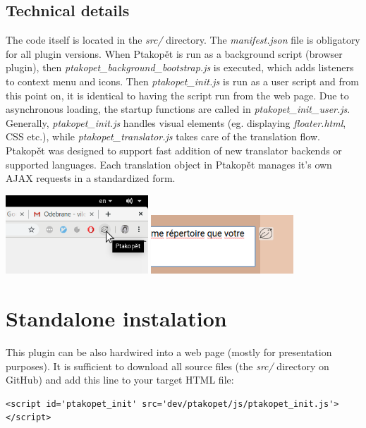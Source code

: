 \documentclass[a4paper]{article}
\begin{document}
\subsection{Technical details}
The code itself is located in the \textit{src/} directory. The \textit{manifest.json} file is obligatory for all plugin versions. When Ptakopět is run as a background script (browser plugin), then \textit{ptakopet\_background\_bootstrap.js} is executed, which adds listeners to context menu and icons. Then \textit{ptakopet\_init.js} is run as a user script and from this point on, it is identical to having the script run from the web page. Due to asynchronous loading, the startup functions are called in \textit{ptakopet\_init\_user.js}. Generally, \textit{ptakopet\_init.js} handles visual elements (eg. displaying \textit{floater.html}, CSS etc.), while \textit{ptakopet\_translator.js} takes care of the translation flow. Ptakopět was designed to support fast addition of new translator backends or supported languages. Each translation object in Ptakopět manages it's own AJAX requests in a standardized form.

\vspace{1cm}
\begin{center}
\includegraphics[width=0.4\textwidth]{screenshot_5}
\hspace{2cm}
\includegraphics[width=0.4\textwidth]{screenshot_6}
\end{center}

\section{Standalone instalation}
This plugin can be also hardwired into a web page (mostly for presentation purposes). It is sufficient to download all source files (the \textit{src/} directory on GitHub) and add this line to your target HTML file: \begin{lstlisting}
<script id='ptakopet_init' src='dev/ptakopet/js/ptakopet_init.js'></script>
\end{lstlisting}
\end{document}
